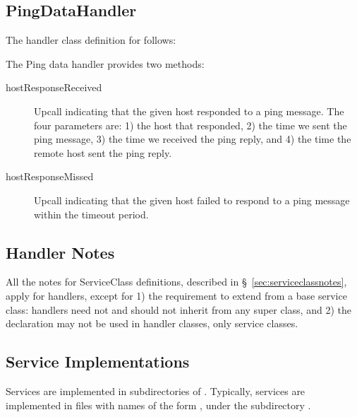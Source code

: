 \subsection{PingDataHandler}
\label{sec:pingdatahandler}

The handler class definition for
 follows:


The Ping data handler provides two methods:

\begin{description}

\item[hostResponseReceived] Upcall indicating that the given host
  responded to a ping message.  The four parameters are: 1) the host
  that responded, 2) the time we sent the ping message, 3) the time we
  received the ping reply, and 4) the time the remote host sent the
  ping reply.

\item[hostResponseMissed] Upcall indicating that the given host
  failed to respond to a ping message within the timeout period.

\end{description}

\subsection{Handler Notes}
\label{sec:datahandlernotes}

All the notes for ServiceClass definitions, described in
\S~\ref{sec:serviceclassnotes}, apply for handlers, except for 1) the
requirement to extend from a base service class: handlers need not and
should not inherit from any super class, and 2) the 
declaration may not be used in handler classes, only service classes.

\subsection{Service Implementations}
\label{sec:service-implementations}

Services are implemented in subdirectories of .
Typically, services are implemented in files with names of the form
, under the subdirectory
.


